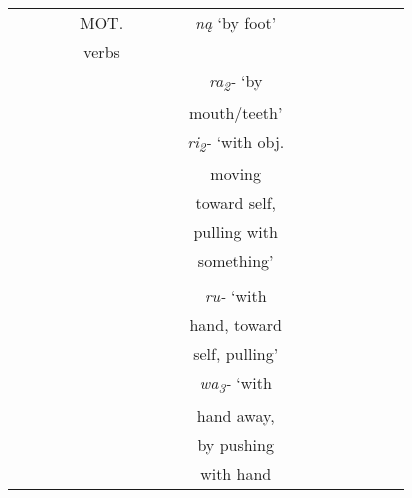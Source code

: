 \documentclass[output=paper]{LSP/langsci}
\begin{document}
\begin{sidewaysfigure}
\begin{tabular}{ | c | c | c | c | c | c | c | c | c | c | c | c | c | c | c | c |}
& & & & MOT. & & & & \textit{n\k{a}} `by foot' & & & & & & & \\
& & & & verbs & & & & & & & & & & & \\
& & & & & & & & \textit{ra\textsubscript{2}-} `by & & & & & & & \\
& & & & & & & & mouth/teeth' & & & & & & & \\
\hline
& & & & & & & & \textit{ri\textsubscript{2}-} `with obj. & & & & & & & \\
& & & & & & & & moving & & & & & & & \\
& & & & & & & & toward self, & & & & & & & \\
& & & & & & & & pulling with & & & & & & & \\
& & & & & & & & something' & & & & & & & \\
& & & & & & & & & & & & & & & \\
& & & & & & & & \textit{ru-} `with & & & & & & & \\
& & & & & & & & hand, toward & & & & & & & \\
& & & & & & & & self, pulling' & & & & & & & \\
& & & & & & & & \textit{wa\textsubscript{3}-} `with & & & & & & & \\
& & & & & & & & hand away, & & & & & & & \\
& & & & & & & & by pushing  & & & & & & & \\
& & & & & & & & with hand & & & & & & & \\
\hline
\end{tabular}
\end{sidewaysfigure}
\end{document}
